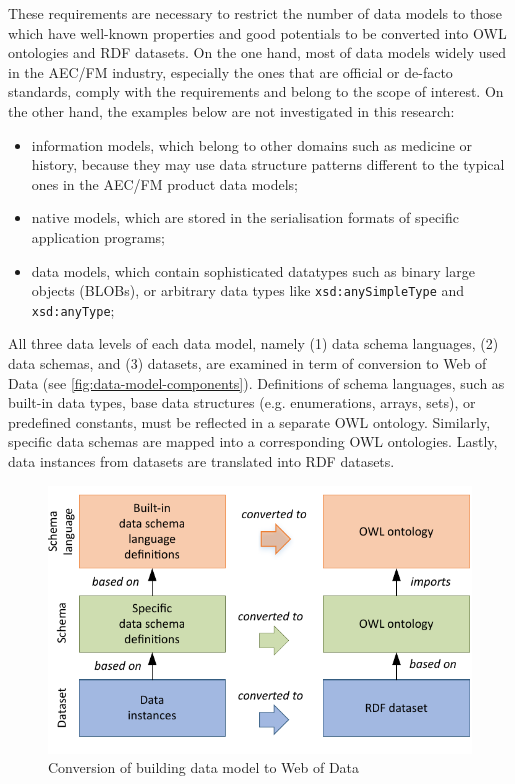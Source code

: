 These requirements are necessary to restrict the number of data models to those which have well-known properties and good potentials to be converted into OWL ontologies and RDF datasets.
On the one hand, most of data models widely used in the AEC/FM industry, especially the ones that are official or de-facto standards, comply with the requirements and belong to the scope of interest.
On the other hand, the examples below are not investigated in this research:
\begin{itemize}
    
    \item information models, which belong to other domains such as medicine or history, because they may use data structure patterns different to the typical ones in the AEC/FM product data models;
    
    \item native models, which are stored in the serialisation formats of specific application programs;
    
    
    \item data models, which contain sophisticated datatypes such as binary large objects (BLOBs), or arbitrary data types like \texttt{xsd:\-any\-Sim\-ple\-Ty\-pe} and \texttt{xsd:\-any\-Ty\-pe};
    
\end{itemize}


All three data levels of each data model, namely (1) data schema languages, (2) data schemas, and (3) datasets, are examined in term of conversion to Web of Data (see \autoref{fig:data-model-components}).
Definitions of schema languages, such as built-in data types, base data structures (e.g. enumerations, arrays, sets), or predefined constants, must be reflected in a separate OWL ontology.
Similarly, specific data schemas are mapped into a corresponding OWL ontologies.
Lastly, data instances from datasets are translated into RDF datasets.


\begin{figure}
    \centering    
    \includegraphics[width=\columnwidth]{images/data-model-components-2.pdf}
    \caption{Conversion of building data model to Web of Data}
    \label{fig:data-model-components}
\end{figure}


